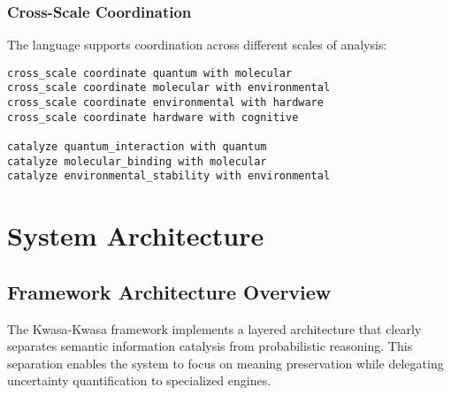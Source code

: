 \documentclass[12pt,a4paper,twoside]{article}
\begin{document}
\begin{itemize}
\subsubsection{Cross-Scale Coordination}

The language supports coordination across different scales of analysis:

\begin{lstlisting}[caption=Cross-Scale Processing Syntax]
cross_scale coordinate quantum with molecular
cross_scale coordinate molecular with environmental
cross_scale coordinate environmental with hardware
cross_scale coordinate hardware with cognitive

catalyze quantum_interaction with quantum
catalyze molecular_binding with molecular
catalyze environmental_stability with environmental
\end{lstlisting}

\section{System Architecture}

\subsection{Framework Architecture Overview}

The Kwasa-Kwasa framework implements a layered architecture that clearly separates semantic information catalysis from probabilistic reasoning. This separation enables the system to focus on meaning preservation while delegating uncertainty quantification to specialized engines.


\end{itemize}
\end{document}
